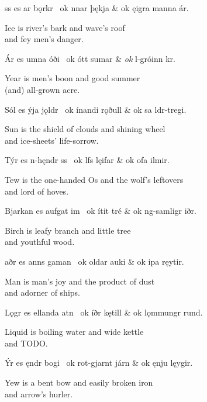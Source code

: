 \bvg\bva%
ss es ar bǫrkr \hld\ ok nnar þękja &
\ind ok ęigra manna ár.\eva

\bvb Ice is river’s bark and wave’s roof \\
\ind and fey men’s danger.\evb\evg


\bvg\bva%
Ár es umna óði \hld\ ok ótt sumar &
\ind \emph{ok} l-gróinn kr.\eva

\bvb Year is men’s boon and good summer \\
\ind (and) all-grown acre.\evb\evg


\bvg\bva%
Sól es ýja jǫldr \hld\ ok ínandi rǫðull &
\ind ok sa ldr-tregi.\eva

\bvb Sun is the shield of clouds and shining wheel \\
\ind and ice-sheets’ life-sorrow.\evb\evg


\bvg\bva%
Týr es n-hęndr ss \hld\ ok lfs lęifar &
\ind ok ofa ilmir.\eva

\bvb Tew is the one-handed Os and the wolf’s leftovers \\
\ind and lord of hoves.\evb\evg


\bvg\bva%
Bjarkan es aufgat im \hld\ ok ítit tré &
\ind ok ng-samligr iðr.\eva

\bvb Birch is leafy branch and little tree \\
\ind and youthful wood.\evb\evg


\bvg\bva%
aðr es anns gaman \hld\ ok oldar auki &
\ind ok ipa ręytir.\eva

\bvb Man is man’s joy and the product of dust \\
\ind and adorner of ships.\evb\evg


\bvg\bva%
Lǫgr es ellanda atn \hld\ ok íðr kętill &
\ind ok lǫmmungr rund.\eva

\bvb Liquid is boiling water and wide kettle \\
\ind and TODO.\evb\evg


\bvg\bva%
Ýr es ęndr bogi \hld\ ok rot-gjarnt járn &
\ind ok ęnju lęygir.\eva

\bvb Yew is a bent bow and easily broken iron \\
\ind and arrow’s hurler.\evb\evg

\sectionline

